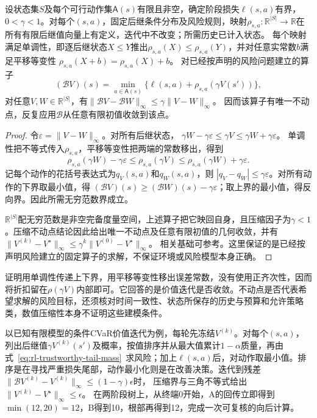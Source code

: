 \begin{theorem}[折扣风险算子的压缩性]
  \label{thm:rl-trustworthy-risk-contraction}
  设状态集$S$及每个可行动作集$\mathsf A(s)$有限且非空，确定阶段损失$\ell(s,a)$有界，$0<\gamma<1$。对每个$(s,a)$，固定后继条件分布及风险规则，映射$\rho_{s,a}:\mathbb R^{|S|}\to\mathbb R$在所有有限后继值向量上有定义，迭代中不改变；所需历史已计入状态。
  每个映射满足单调性，即逐后继状态$X\leq Y$推出$\rho_{s,a}(X)\leq\rho_{s,a}(Y)$，并对任意实常数$b$满足平移等变性
  $\rho_{s,a}(X+b)=\rho_{s,a}(X)+b$。
  对已经按声明的风险问题建立的算子
  \[
    (\mathcal B V)(s)=\min_{a\in\mathsf A(s)}\{\ell(s,a)+\rho_{s,a}(\gamma V(s'))\},
  \]
  对任意$V,W\in\mathbb R^{|S|}$，有$\lVert\mathcal B V-\mathcal B W\rVert_\infty\leq\gamma\lVert V-W\rVert_\infty$。
  因而该算子有唯一不动点，反复应用$\mathcal B$从任意有限初值收敛到该点。
\end{theorem}
\begin{proof}
  令$\varepsilon=\lVert V-W\rVert_\infty$。对所有后继状态，
  $\gamma W-\gamma\varepsilon\leq\gamma V\leq\gamma W+\gamma\varepsilon$。
  单调性把不等式传入$\rho_{s,a}$，平移等变性把两端的常数移出，得到
  \[
    \rho_{s,a}(\gamma W)-\gamma\varepsilon
      \leq\rho_{s,a}(\gamma V)
      \leq\rho_{s,a}(\gamma W)+\gamma\varepsilon.
  \]
  记每个动作的花括号表达式为$q_V(s,a)$和$q_W(s,a)$，则
  $|q_V-q_W|\leq\gamma\varepsilon$。对所有动作的下界取最小值，得
  $(\mathcal B V)(s)\geq(\mathcal B W)(s)-\gamma\varepsilon$；取上界的最小值，得反向界。因此所需无穷范数界成立。

  $\mathbb R^{|S|}$配无穷范数是非空完备度量空间，上述算子把它映回自身，且压缩因子为$\gamma<1$。压缩不动点结论因此给出唯一不动点及任意有限初值的几何收敛，并有
  $\lVert V^{(k)}-V^\star\rVert_\infty\leq\gamma^k\lVert V^{(0)}-V^\star\rVert_\infty$。
  相关基础可参考。这里保证的是已经按声明风险建立的固定算子的求解，不保证环境或风险模型本身正确。
\end{proof}

证明用单调性传递上下界，用平移等变性移出误差常数，没有使用正齐次性，因而将折扣留在$\rho(\gamma V)$内部即可。它回答的是价值迭代是否收敛。不动点是否代表希望求解的风险目标，还须核对时间一致性、状态所保存的历史与预算和允许策略类，数值压缩性本身不证明这些建模条件。

以已知有限模型的条件CVaR价值迭代为例，每轮先冻结$V^{(k)}$。对每个$(s,a)$，列出后继值$\gamma V^{(k)}(s')$及概率，按值排序并从最大值累计$1-\alpha$质量，再由式~\eqref{eq:rl-trustworthy-tail-mass}~求风险；加上$\ell(s,a)$后，对动作取最小值。排序是在寻找严重损失尾部，动作最小化则是在改善决策。迭代到残差
$\lVert\mathcal B V^{(k)}-V^{(k)}\rVert_\infty\leq(1-\gamma)\epsilon$时，
压缩界与三角不等式给出
$\lVert V^{(k)}-V^\star\rVert_\infty\leq\epsilon$。
在两阶段树上，从终端0开始，A的回传立即得到$\min(12,20)=12$，B得到10，根部再得到12，完成一次可复核的向后计算。

